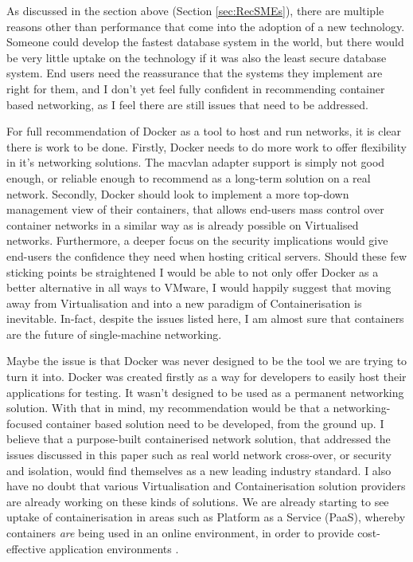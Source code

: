 As discussed in the section above (Section \ref{sec:RecSMEs}), there are multiple reasons other than performance that come into the adoption of a new technology. Someone could develop the fastest database system in the world, but there would be very little uptake on the technology if it was also the least secure database system. End users need the reassurance that the systems they implement are right for them, and I don't yet feel fully confident in recommending container based networking, as I feel there are still issues that need to be addressed.

For full recommendation of Docker as a tool to host and run networks, it is clear there is work to be done. Firstly, Docker needs to do more work to offer flexibility in it's networking solutions. The macvlan adapter support is simply not good enough, or reliable enough to recommend as a long-term solution on a real network. Secondly, Docker should look to implement a more top-down management view of their containers, that allows end-users mass control over container networks in a similar way as is already possible on Virtualised networks. Furthermore, a deeper focus on the security implications would give end-users the confidence they need when hosting critical servers. Should these few sticking points be straightened I would be able to not only offer Docker as a better alternative in all ways to VMware, I would happily suggest that moving away from Virtualisation and into a new paradigm of Containerisation is inevitable. In-fact, despite the issues listed here, I am almost sure that containers are the future of single-machine networking.

Maybe the issue is that Docker was never designed to be the tool we are trying to turn it into. Docker was created firstly as a way for developers to easily host their applications for testing. It wasn't designed to be used as a permanent networking solution. With that in mind, my recommendation would be that a networking-focused container based solution need to be developed, from the ground up. I believe that a purpose-built containerised network solution, that addressed the issues discussed in this paper such as real world network cross-over, or security and isolation, would find themselves as a new leading industry standard. I also have no doubt that various Virtualisation and Containerisation solution providers are already working on these kinds of solutions. We are already starting to see uptake of containerisation in areas such as Platform as a Service (PaaS), whereby containers \emph{are} being used in an online environment, in order to provide cost-effective application environments \citep[Page 55]{PAASCloudBook}. %
